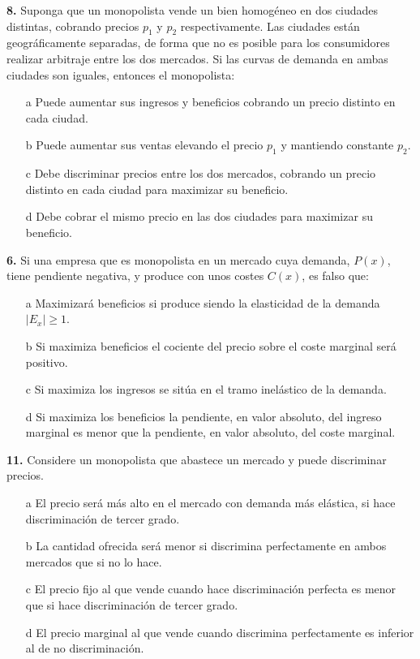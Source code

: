 \documentclass{nuevotema}
\begin{document}
\textbf{8.} Suponga que un monopolista vende un bien homogéneo en dos ciudades distintas, cobrando precios $p_1$ y $p_2$ respectivamente. Las ciudades están geográficamente separadas, de forma que no es posible para los consumidores realizar arbitraje entre los dos mercados. Si las curvas de demanda en ambas ciudades son iguales, entonces el monopolista:
\begin{enumerate}
	\item[a] Puede aumentar sus ingresos y beneficios cobrando un precio distinto en cada ciudad.
	\item[b] Puede aumentar sus ventas elevando el precio $p_1$ y mantiendo constante $p_2$.
	\item[c] Debe discriminar precios entre los dos mercados, cobrando un precio distinto en cada ciudad para maximizar su beneficio.
	\item[d] Debe cobrar el mismo precio en las dos ciudades para maximizar su beneficio.
\end{enumerate}


\textbf{6.} Si una empresa que es monopolista en un mercado cuya demanda, $P(x)$, tiene pendiente negativa, y produce con unos costes $C(x)$, es falso que:
\begin{enumerate}
	\item[a] Maximizará beneficios si produce siendo la elasticidad de la demanda $|E_x| \geq 1$.
	\item[b] Si maximiza beneficios el cociente del precio sobre el coste marginal será positivo.
	\item[c] Si maximiza los ingresos se sitúa en el tramo inelástico de la demanda.
	\item[d] Si maximiza los beneficios la pendiente, en valor absoluto, del ingreso marginal es menor que la pendiente, en valor absoluto, del coste marginal.
\end{enumerate}

\textbf{11.} Considere un monopolista que abastece un mercado y puede discriminar precios.
\begin{enumerate}
	\item[a] El precio será más alto en el mercado con demanda más elástica, si hace discriminación de tercer grado.
	\item[b] La cantidad ofrecida será menor si discrimina perfectamente en ambos mercados que si no lo hace.
	\item[c] El precio fijo al que vende cuando hace discriminación perfecta es menor que si hace discriminación de tercer grado.
	\item[d] El precio marginal al que vende cuando discrimina perfectamente es inferior al de no discriminación.
\end{enumerate}
\end{document}

